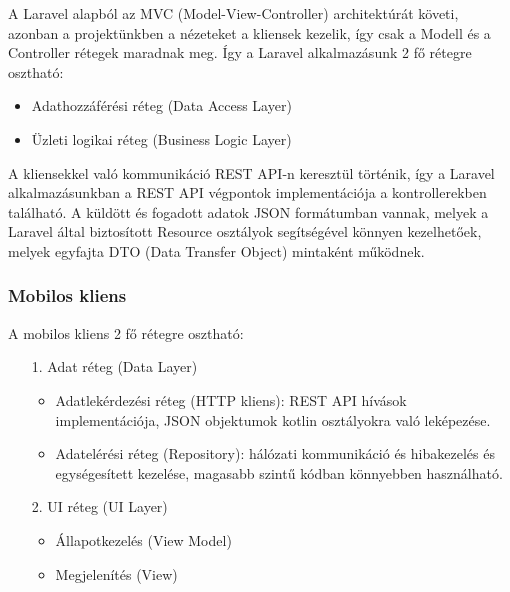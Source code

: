 A Laravel alapból az MVC (Model-View-Controller) architektúrát követi, azonban a projektünkben a nézeteket a kliensek kezelik, így csak a Modell és a Controller rétegek maradnak meg. Így a Laravel alkalmazásunk 2 fő rétegre osztható:

\begin{itemize}
    \item Adathozzáférési réteg (Data Access Layer)
    \item Üzleti logikai réteg (Business Logic Layer)
\end{itemize}

A kliensekkel való kommunikáció REST API-n keresztül történik, így a Laravel alkalmazásunkban a REST API végpontok implementációja a kontrollerekben található. A küldött és fogadott adatok JSON formátumban vannak, melyek a Laravel által biztosított Resource osztályok segítségével könnyen kezelhetőek, melyek egyfajta DTO (Data Transfer Object) mintaként működnek.

\subsubsection{Mobilos kliens}

A mobilos kliens 2 fő rétegre osztható:

\begin{itemize}
    \item  [1.] Adat réteg (Data Layer)
    \begin{itemize}
        \item Adatlekérdezési réteg (HTTP kliens): REST API hívások implementációja, JSON objektumok kotlin osztályokra való leképezése.
        \item Adatelérési réteg (Repository): hálózati kommunikáció és hibakezelés és egységesített kezelése, magasabb szintű kódban könnyebben használható.
    \end{itemize}
    \item  [2.] UI réteg (UI Layer)
    \begin{itemize}
        \item  Állapotkezelés (View Model)
        \item  Megjelenítés (View)

    \end{itemize}
\end{itemize}